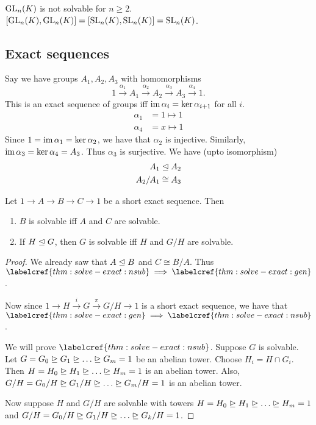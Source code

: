 $\operatorname{GL}_n(K)$ is not solvable for $n \ge 2$.
$[\operatorname{GL}_n(K), \operatorname{GL}_n(K)] = [\operatorname{SL}_n(K), \operatorname{SL}_n(K)] = \operatorname{SL}_n(K)$.

\subsection{Exact sequences} \label{sec:exact-sequences}
Say we have groups $A_1, A_2, A_3$ with homomorphisms \[
    1 \xrightarrow{\alpha_1} A_1
        \xrightarrow{\alpha_2} A_2
        \xrightarrow{\alpha_3} A_3
        \xrightarrow{\alpha_4} 1.
\] This is an exact sequence of groups iff
$\operatorname{im} \alpha_i = \ker \alpha_{i+1}$ for all $i$.
\begin{align*}
    \alpha_1 &= 1 \mapsto 1 \\
    \alpha_4 &= x \mapsto 1
\end{align*}
Since $1 = \operatorname{im} \alpha_1 = \ker \alpha_2$, we have that $\alpha_2$ is
injective.
Similarly, $\operatorname{im} \alpha_3 = \ker \alpha_4 = A_3$.
Thus $\alpha_3$ is surjective.
We have (upto isomorphism) \begin{align*}
    A_1 &\trianglelefteq A_2 \\
    A_2/A_1 &\cong A_3
\end{align*}

\begin{proposition} \label{thm:solve-exact}
    Let $1 \to A \to B \to C \to 1$ be a short exact sequence.
    Then
    \begin{enumerate}
        \item \label{thm:solve-exact:gen}
        $B$ is solvable iff $A$ and $C$ are solvable.
        \item \label{thm:solve-exact:nsub}
        If $H \trianglelefteq G$, then $G$ is solvable iff $H$ and
        $G/H$ are solvable.
    \end{enumerate}
\end{proposition}
\begin{proof}
    We already saw that $A \trianglelefteq B$ and $C \cong B/A$.
    Thus $\labelcref{thm:solve-exact:nsub} \implies
    \labelcref{thm:solve-exact:gen}$.

    Now since $1 \to H \xrightarrow{i} G \xrightarrow{\pi} G/H \to 1$
    is a short exact sequence, we have that $\labelcref{thm:solve-exact:gen}
    \implies \labelcref{thm:solve-exact:nsub}$.

    We will prove $\labelcref{thm:solve-exact:nsub}$.
    Suppose $G$ is solvable.
    Let $G = G_0 \nsup G_1 \nsup \dots \nsup G_m = 1$ be an abelian
    tower.
    Choose $H_i = H \cap G_i$.
    Then $H = H_0 \nsup H_1 \nsup \dots \nsup H_m = 1$ is an abelian
    tower.
    Also, $G/H = G_0/H \nsup G_1/H \nsup \dots \nsup G_m/H = 1$ is an
    abelian tower.

    Now suppose $H$ and $G/H$ are solvable with towers
    $H = H_0 \nsup H_1 \nsup \dots \nsup H_m = 1$ and
    $G/H = G_0/H \nsup G_1/H \nsup \dots \nsup G_k/H = 1$.
\end{proof}
